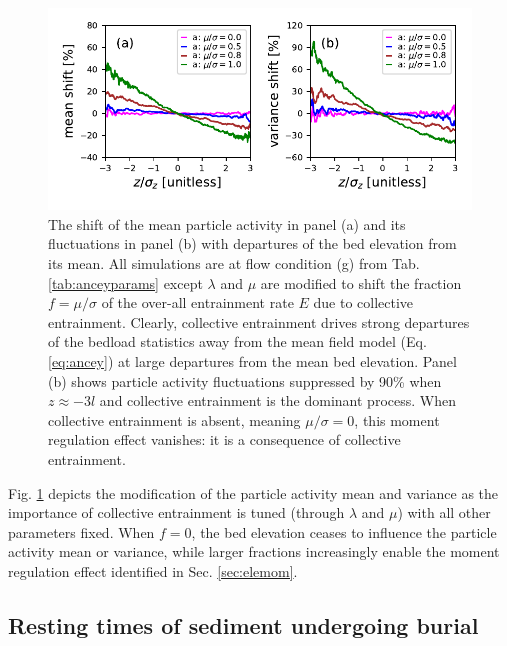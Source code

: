 \begin{figure}[!htbp]
	\includegraphics[width=\linewidth,keepaspectratio]{./figures/ch3/colent-suppression.pdf}
	\caption{The shift of the mean particle activity in panel (a) and its fluctuations in panel (b) with departures of the bed elevation from its mean. All simulations are at flow condition (g) from Tab. \ref{tab:anceyparams} except $\lambda$ and $\mu$ are modified to shift the fraction $f=\mu/\sigma$ of the over-all entrainment rate $E$ due to collective entrainment. Clearly, collective entrainment drives strong departures of the bedload statistics away from the mean field model (Eq. \ref{eq:ancey}) at large departures from the mean bed elevation. Panel (b) shows particle activity fluctuations suppressed by 90\% when $z\approx -3l$ and collective entrainment is the dominant process. When collective entrainment is absent, meaning $\mu/\sigma=0$, this moment regulation effect vanishes: it is a consequence of collective entrainment.}
	\label{fig:colent}
\end{figure}
Fig. \ref{fig:colent} depicts the modification of the particle activity mean and variance as the importance of collective entrainment is tuned (through $\lambda$ and $\mu$) with all other parameters fixed. When $f=0$, the bed elevation ceases to influence the particle activity mean or variance, while larger fractions increasingly enable the moment regulation effect identified in Sec. \ref{sec:elemom}.

\subsection{Resting times of sediment undergoing burial}
\label{sec:elertcdf}

